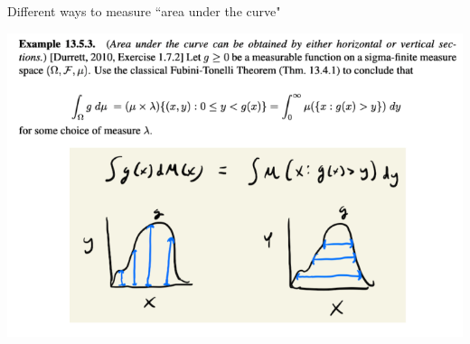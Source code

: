 \documentclass[10pt]{beamer}
\begin{document}
\begin{frame}{Different ways to measure ``area under the curve"}
\begin{center}
\includegraphics[width=1.0\textwidth]{images/auc_via_either_horizontal_or_vertical_sections}
\end{center}
\end{frame}

\end{document}
